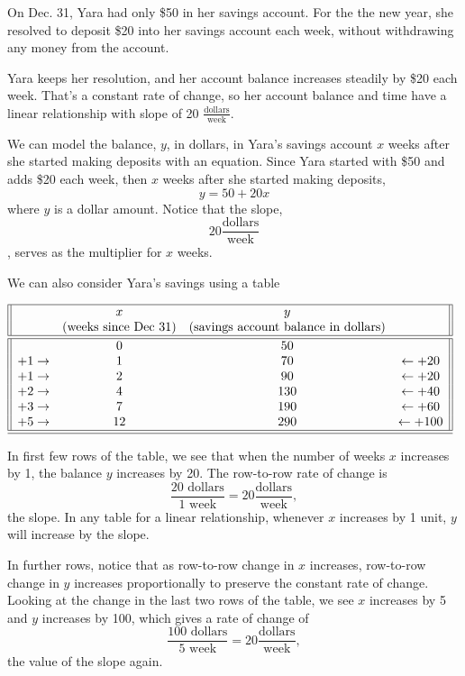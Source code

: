 \documentclass[nooutcomes]{ximera}
\begin{document}
\begin{example}
On Dec. 31, Yara had only \$50 in her savings account. For the the new year, she resolved to deposit \$20 into her savings account each week, without withdrawing any money from the account. 

Yara keeps her resolution, and her account balance increases steadily by \$20 each week. That's a constant rate of change, so her account balance and time have a linear relationship with slope of 20 $\frac{\text{dollars}}{\text{week}}$.  

\begin{explanation}

We can model the balance, $y$,  in dollars, in Yara's savings account $x$  weeks after she started making deposits with an equation. Since Yara started with \$50  and adds \$20  each week, then $x$  weeks after she started making deposits, $$y=50+20x$$ where $y$  is a dollar amount. Notice that the slope, $$20 \frac{\text{dollars}}{\text{week}}$$,  serves as the multiplier for $x$ weeks.

We can also consider Yara's savings using a table

\begin{center}
\(
\begin{array}{||cccc||}
\hline
&x &y&\\
&\text{(weeks since Dec 31)}&\text{(savings account balance in dollars)}&\\
\hline 
\hline
&0&50&\\
+1\rightarrow&1&70&\leftarrow +20\\
+1\rightarrow&2&90&\leftarrow +20\\
+2\rightarrow&4&130&\leftarrow +40\\
+3\rightarrow&7&190&\leftarrow +60\\
+5\rightarrow&12&290&\leftarrow +100\\
\hline 
\hline
\end{array}
\)
\end{center}



In first few rows of the table, we see that when the number of weeks $x$ increases by 1, the balance $y$  increases by 20.   The row-to-row rate of change is $$\frac{\text{20 dollars}}{\text{1 week}} = 20 \frac{\text{dollars}}{\text{week}},$$   the slope. In any table for a linear relationship, whenever $x$  increases by 1  unit, $y$  will increase by the slope.

In further rows, notice that as row-to-row change in $x$ increases, row-to-row change in $y$  increases proportionally to preserve the constant rate of change. Looking at the change in the last two rows of the table, we see $x$  increases by 5  and $y$  increases by 100,  which gives a rate of change of  $$\frac{\text{100 dollars}}{\text{5 week}} = 20 \frac{\text{dollars}}{\text{week}},$$  the value of the slope again.


\end{explanation}
\end{example}
\end{document}
